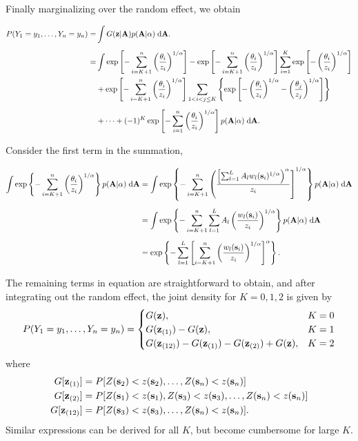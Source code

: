 Finally marginalizing over the random effect, we obtain

\begin{align} \label{rbeq:joint}
    P(Y_1=y_1,\ldots,Y_n=y_n) =&\int G(\mathbf{z} | \mathbf{A}) p( \mathbf{A} | \alpha) \; \text{d} \mathbf{A}. \nonumber\\[0.5em]
      =& \int \exp \left[ -\sum_{ i = K+1}^{ n }\left( \frac{ \theta_i }{ z_i } \right)^{1/\alpha} \right] - \exp \left[ -\sum_{ i = K+1}^{ n }\left( \frac{ \theta_i }{ z_i } \right)^{1/\alpha} \right] \sum_{ i = 1}^{K} \exp\left[ -\left( \frac{ \theta_i }{ z_i } \right)^{ 1/\alpha} \right] \nonumber\\
    &  + \exp \left[ -\sum_{ i = K+1}^{ n }\left( \frac{ \theta_i }{ z_i } \right)^{1/\alpha} \right] \sum_{ 1 < i < j \le K } \left\{ \exp \left[ - \left( \frac{ \theta_i }{ z_i } \right)^{ 1/\alpha} - \left( \frac{ \theta_j }{ z_j } \right)^{ 1/\alpha } \right] \right \} \nonumber \\[0.5em]
    & + \cdots + (-1)^K \exp\left[ - \sum_{ i = 1 }^{ n }\left( \frac{ \theta_i }{ z_i } \right)^{ 1/\alpha} \right] p( \mathbf{A} | \alpha) \; \text{d} \mathbf{A}.
\end{align}

Consider the first term in the summation,

\begin{align}
  \int \exp \left\{ -\sum_{ i = K+1}^{ n }\left( \frac{ \theta_i }{ z_i } \right)^{1/\alpha} \right\} p( \mathbf{A} | \alpha) \; \text{d} \mathbf{A} &= \int \exp \left\{ - \sum_{ i = K + 1 }^n \left( \frac{ \left[ \sum_{ l = 1 }^L  A_l w_{l}(\mathbf{s}_i)^{1/\alpha} \right)^\alpha }{ z_i} \right]^{ 1/\alpha } \right \} p( \mathbf{A} | \alpha) \; \text{d} \mathbf{A} \nonumber \\[0.5em]
   &= \int \exp \left\{ -\sum_{ i = K + 1}^n \sum_{ l = 1}^L A_l \left( \frac{ w_l (\mathbf{s}_i) }{ z_i } \right)^{1/\alpha} \right \} p( \mathbf{A} | \alpha) \; \text{d} \mathbf{A} \nonumber \\[0.5em]
   &=\exp\left\{-\sum_{ l = 1}^L \left[ \sum_{ i = K + 1 }^n \left( \frac{ w_l(\mathbf{s}_i)}{ z_i} \right)^{1/\alpha} \right]^\alpha \right\}.
\end{align}

The remaining terms in equation  are straightforward to obtain, and after integrating out the random effect, the joint density for $K = 0, 1, 2$ is given by
\begin{align}\label{rbeq:pmf}
  P(Y_1=y_1,\ldots,Y_n=y_n) =  \begin{cases}
      G(\mathbf{z}), & K=0 \\
      G(\mathbf{z}_{(1)})-G(\mathbf{z}), & K=1 \\
      G(\mathbf{z}_{(12)})-G(\mathbf{z}_{(1)})-G(\mathbf{z}_{(2)})+G(\mathbf{z}), & K=2
    \end{cases}
\end{align}
where
\begin{align*}
  G[\mathbf{z}_{(1)}] &= P[Z(\mathbf{s}_2)<z(\mathbf{s}_2),\ldots,Z(\mathbf{s}_n)<z(\mathbf{s}_n)] \\
  G[\mathbf{z}_{(2)}] &= P[Z(\mathbf{s}_1)<z(\mathbf{s}_1),Z(\mathbf{s}_3)<z(\mathbf{s}_3),\ldots,Z(\mathbf{s}_n)<z(\mathbf{s}_n)]\\
  G[\mathbf{z}_{(12)}] &= P[Z(\mathbf{s}_3)<z(\mathbf{s}_3),\ldots,Z(\mathbf{s}_n)<z(\mathbf{s}_n)].
\end{align*}
Similar expressions can be derived for all $K$, but become cumbersome for large $K$.

